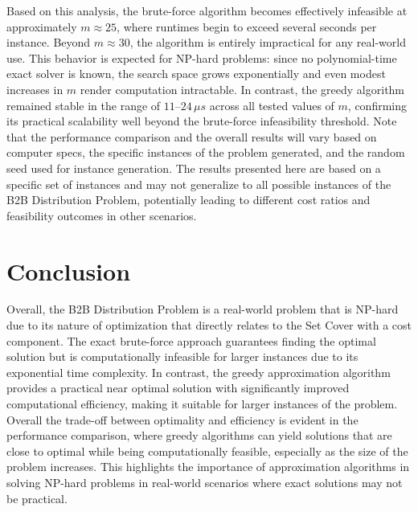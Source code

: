 \documentclass[letterpaper]{article}
\begin{document}
Based on this analysis, the brute-force algorithm becomes effectively infeasible at approximately $m \approx 25$, where runtimes begin to exceed several seconds per instance. Beyond $m \approx 30$, the algorithm is entirely impractical for any real-world use. This behavior is expected for NP-hard problems: since no polynomial-time exact solver is known, the search space grows exponentially and even modest increases in $m$ render computation intractable. In contrast, the greedy algorithm remained stable in the range of $11$--$24\,\mu s$ across all tested values of $m$, confirming its practical scalability well beyond the brute-force infeasibility threshold.
\newline
\newline
Note that the performance comparison and the overall results will vary based on computer specs, the specific instances of the problem generated, and the random seed used for instance generation. The results presented here are based on a specific set of instances and may not generalize to all possible instances of the B2B Distribution Problem, potentially leading to different cost ratios and feasibility outcomes in other scenarios.

\section{Conclusion}
Overall, the B2B Distribution Problem is a real-world problem that is NP-hard due to its nature of optimization that directly relates to the Set Cover with a cost component. The exact brute-force approach guarantees finding the optimal solution but is computationally infeasible for larger instances due to its exponential time complexity. In contrast, the greedy approximation algorithm provides a practical near optimal solution with significantly improved computational efficiency, making it suitable for larger instances of the problem. Overall the trade-off between optimality and efficiency is evident in the performance comparison, where greedy algorithms can yield solutions that are close to optimal while being computationally feasible, especially as the size of the problem increases. This highlights the importance of approximation algorithms in solving NP-hard problems in real-world scenarios where exact solutions may not be practical. 
\end{document}
